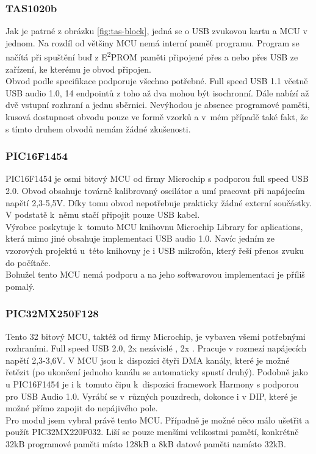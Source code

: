 \subsubsection{TAS1020b}	

Jak je patrné z obrázku \ref{fig:tas-block}, jedná se o USB \iis zvukovou kartu a MCU v jednom. Na rozdíl od většiny MCU nemá interní paměť programu. Program se načítá při spuštění buď z E\textsuperscript{2}PROM  paměti připojené přes \iic a nebo přes USB ze zařízení, ke kterému je obvod připojen.\\
Obvod podle specifikace \cite{tas} podporuje všechno potřebné. Full speed USB 1.1 včetně USB audio 1.0, 14 endpointů z toho až dva mohou být isochronní. Dále nabízí až dvě vstupní \iis rozhraní a jednu \iic sběrnici. Nevýhodou je absence programové paměti, kusová dostupnost obvodu pouze ve formě vzorků a v~mém případě také fakt, že s tímto druhem obvodů nemám žádné zkušenosti.

\subsubsection{PIC16F1454}
PIC16F1454 je osmi bitový MCU od firmy Microchip s podporou full speed USB 2.0. Obvod obsahuje továrně kalibrovaný oscilátor a umí pracovat při napájecím napětí 2,3-5,5V. Díky tomu obvod nepotřebuje prakticky žádné externí součástky. V podstatě k~němu stačí připojit pouze USB kabel.\\
Výrobce poskytuje k~tomuto MCU knihovnu Microchip Library for aplications, která mimo jiné obsahuje implementaci USB audio 1.0. Navíc jedním ze vzorových projektů u~této knihovny je i USB mikrofón, který řeší přenos zvuku do počítače.\\
Bohužel tento MCU nemá podporu \iis a na jeho softwarovou implementaci je příliš pomalý. 

\subsubsection{PIC32MX250F128}
Tento 32 bitový MCU, taktéž od firmy Microchip, je vybaven všemi potřebnými rozhraními. Full speed USB 2.0, 2x nezávislé \iis, 2x \iic. Pracuje v rozmezí napájecích napětí 2,3-3,6V. V MCU jsou k~dispozici čtyři DMA kanály, které je možné řetězit (po ukončení jednoho kanálu se automaticky spustí druhý). Podobně jako u PIC16F1454 je i k~tomuto čipu k~dispozici framework Harmony \cite{harmony} s podporou pro USB Audio 1.0. Vyrábí se v~různých pouzdrech, dokonce i v DIP, které je možné přímo zapojit do nepájivého pole.\\
Pro modul jsem vybral právě tento MCU. Případně je možné něco málo ušetřit a použít PIC32MX220F032. Liší se pouze menšími velikostmi pamětí, konkrétně 32kB programové paměti místo 128kB a 8kB datové paměti namísto 32kB.

